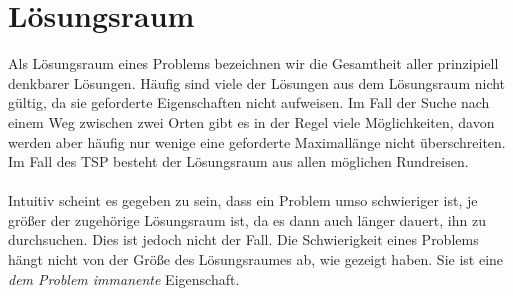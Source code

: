 \section{Lösungsraum}
Als Lösungsraum eines Problems bezeichnen wir die Gesamtheit aller prinzipiell denkbarer Lösungen. Häufig sind viele der Lösungen aus dem Lösungsraum nicht gültig, da sie geforderte Eigenschaften nicht aufweisen. Im Fall der Suche nach einem Weg zwischen zwei Orten gibt es in der Regel viele Möglichkeiten, davon werden aber häufig nur wenige eine geforderte Maximallänge nicht überschreiten. Im Fall des \textsc{TSP} besteht der Lösungsraum aus allen möglichen Rundreisen. \\
\\
Intuitiv scheint es gegeben zu sein, dass ein Problem umso schwieriger ist, je größer der zugehörige Lösungsraum ist, da es dann auch länger dauert, ihn zu durchsuchen. Dies ist jedoch nicht der Fall. Die Schwierigkeit eines Problems hängt nicht von der Größe des Lösungsraumes ab, wie \cite{VV} gezeigt haben. Sie ist eine \emph{dem Problem immanente} Eigenschaft.